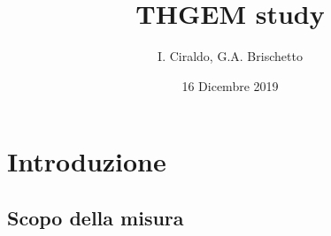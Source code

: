 \documentclass[a4paper, 11 pt]{article}
\title{\bf {\huge THGEM study} }
\author{I. Ciraldo, G.A. Brischetto}
\date{16 Dicembre 2019}
\begin{document}
\maketitle

\section{Introduzione}


\subsection{Scopo della misura}
\end{document}
